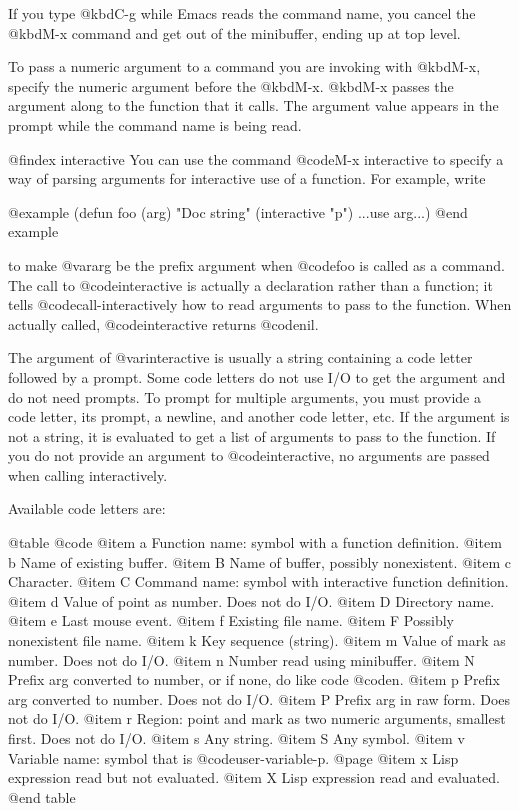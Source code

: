 {{  If you type @kbd{C-g} while Emacs reads the command name, you cancel
the @kbd{M-x} command and get out of the minibuffer, ending up at top level.

  To pass a numeric argument to a command you are invoking with
@kbd{M-x}, specify the numeric argument before the @kbd{M-x}.  @kbd{M-x}
passes the argument along to the function that it calls.  The argument
value appears in the prompt while the command name is being read.

@findex interactive
You can use the command @code{M-x interactive} to specify a way of
parsing arguments for interactive use of a function.  For example, write

@example
  (defun foo (arg) "Doc string" (interactive "p") ...use arg...)
@end example

to make @var{arg} be the prefix argument when @code{foo} is called as a
command.  The call to @code{interactive} is actually a declaration
rather than a function; it tells @code{call-interactively} how to read
arguments to pass to the function.  When actually called, @code{interactive}
returns @code{nil}.

The argument of @var{interactive} is usually a string containing a code
letter followed by a prompt.  Some code letters do not use I/O to get
the argument and do not need prompts.  To prompt for multiple arguments,
you must provide a code letter, its prompt, a newline, and another code
letter, etc.  If the argument is not a string, it is evaluated to get a
list of arguments to pass to the function.  If you do not provide an
argument to @code{interactive}, no arguments are passed when calling
interactively.

Available code letters are:

@table @code
@item a
Function name: symbol with a function definition.
@item b
Name of existing buffer.
@item B
Name of buffer, possibly nonexistent.
@item c
Character.
@item C
Command name: symbol with interactive function definition.
@item d
Value of point as number.  Does not do I/O.
@item D
Directory name.
@item e
Last mouse event.
@item f
Existing file name.
@item F
Possibly nonexistent file name.
@item k
Key sequence (string).
@item m
Value of mark as number.  Does not do I/O.
@item n
Number read using minibuffer.
@item N
Prefix arg converted to number, or if none, do like code @code{n}.
@item p
Prefix arg converted to number.  Does not do I/O.
@item P
Prefix arg in raw form.  Does not do I/O.
@item r
Region: point and mark as two numeric arguments, smallest first.  Does
not do I/O.
@item s
Any string.
@item S
Any symbol.
@item v
Variable name: symbol that is @code{user-variable-p}.
@page
@item x
Lisp expression read but not evaluated.
@item X
Lisp expression read and evaluated.
@end table

}}
